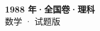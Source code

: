 \documentclass[zihao=-4, a4paper]{ctexart}
\begin{document}
\begin{center}
  {\Large\bfseries 1988 年·全国卷·理科}\\[4pt]
  {\large 数学 · 试题版}
\end{center}
\medskip
{}

\end{document}
